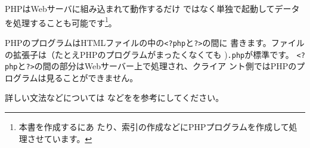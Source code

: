 PHPはWebサーバに組み込まれて動作するだけ
ではなく単独で起動してデータを処理することも可能です\footnote{本書を作成するにあ
たり、索引の作成などにPHPプログラムを作成して処理させています。}。

PHPのプログラムはHTMLファイルの中の\texttt{<?php}と\texttt{?>}の間に
書きます。ファイルの拡張子は（たとえPHPのプログラムがまったくなくても
)\texttt{.php}が標準です。
\texttt{<?php}と\texttt{?>}の間の部分はWebサーバー上で処理され、クライア
ント側ではPHPのプログラムは見ることができません。

詳しい文法などについては%
\cite{learningphp}などをを参考にしてください。

\iffalse\else

%



%
%
\fi